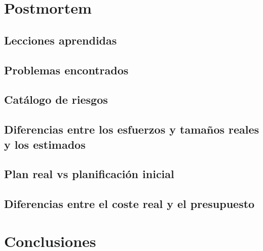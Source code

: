 \documentclass[10pt,spanish]{article}
\let\stdsection\section
\renewcommand\section{\newpage\stdsection}
\begin{document}
\section{Postmortem}


\subsection{Lecciones aprendidas}


\subsection{Problemas encontrados}


\subsection{Catálogo de riesgos}


\subsection{Diferencias entre los esfuerzos y tamaños reales y los estimados}


\subsection{Plan real vs planificación inicial}


\subsection{Diferencias entre el coste real y el presupuesto}



\section{Conclusiones}

\end{document}
